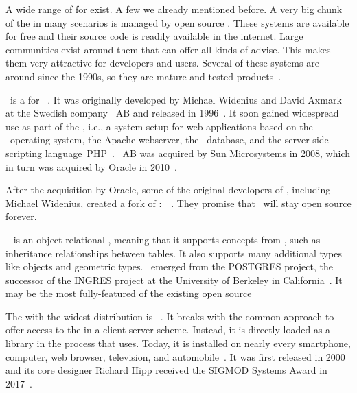 %
%
A wide range of  for  exist.
A few we already mentioned before.%
%
%
A very big chunk of the  in many scenarios is managed by open source .
These systems are available for free and their source code is readily available in the internet.
Large communities exist around them that can offer all kinds of advise.
This makes them very attractive for developers and users.
Several of these systems are around since the 1990s, so they are mature and tested products~\cite{C20245YOQ}.

\mysql\ is a  for ~\cite{WAM2002MRMDFTS,TA2024DDAMWPAM,BT2021HPM,RGS2021BTOTONAMDFPC,D2015LMAM}.
It was originally developed by Michael Widenius and David Axmark at the Swedish company \mysql~AB and released in 1996~\cite{C20245YOQ}.
It soon gained widespread use as part of the \lampStack, i.e., a system setup for web applications based on the \linux\ operating system, the Apache webserver, the \mysql\ database, and the server-side scripting language~PHP~\cite{C2022HAFTLS,H2020ULU2E}.
\mysql~AB was acquired by Sun Microsystems in 2008, which in turn was acquired by Oracle in 2010~\cite{C20245YOQ}.

After the acquisition by Oracle, some of the original developers of \mysql, including Michael Widenius, created a fork of \mysql:~\mariadb~\cite{R2014MM,B2019LTMEELFFSAA,D2015LMAM,AA2018QAWMV1ITSQ,AA2018QAWMV2IDQ}.
They promise that \mariadb\ will stay open source forever.

\postgresql~\cite{TA2024DDAMWPAM,FP2023LP,OH2017PUAR,B2024PELUYDW} is an object-relational , meaning that it supports concepts from , such as inheritance relationships between tables.
It also supports many additional types like  objects and geometric types.
\postgresql\ emerged from the POSTGRES project, the successor of the INGRES project at the University of Berkeley in California~\cite{C20245YOQ}.
It may be the most fully-featured of the existing open source  

The   with the widest distribution is \sqlite~\cite{WB2019RHSOOS,GPBHKP2022SPPAF,C20245YOQ}.
It breaks with the common approach to offer access to the  in a client-server scheme.
Instead, it is directly loaded as a library in the process that uses.
Today, it is installed on nearly every smartphone, computer, web browser, television, and automobile~\cite{WB2019RHSOOS,GPBHKP2022SPPAF,C20245YOQ}.
It was first released in 2000 and its core designer Richard Hipp received the SIGMOD Systems Award in 2017~\cite{C20245YOQ}.

